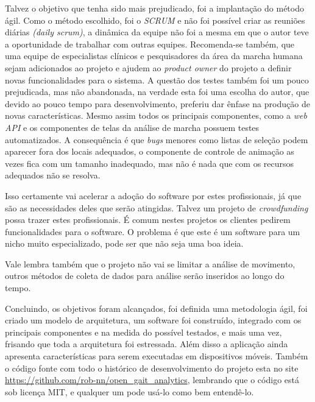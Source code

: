 Talvez o objetivo que tenha sido mais prejudicado, foi a implantação do método ágil. 
Como o método escolhido, foi o \emph{SCRUM} e não foi possível criar as reuniões diárias \emph{(daily scrum)}, a dinâmica da equipe não foi a mesma em que o autor teve a oportunidade de trabalhar com outras equipes.
Recomenda-se também, que uma equipe de especialistas clínicos e pesquisadores da área da marcha humana sejam adicionados ao projeto e ajudem ao \emph{product owner} do projeto a definir novas funcionalidades para o sistema. 
A questão dos testes também foi um pouco prejudicada, mas não abandonada, na verdade esta foi uma escolha do autor, que devido ao pouco tempo para desenvolvimento, preferiu dar ênfase na produção de novas características. Mesmo assim todos os principais componentes, como a \emph{web API} e os componentes de telas da análise de marcha possuem testes automatizados.
A consequência é que \emph{bugs} menores como listas de seleção podem aparecer fora dos locais adequados, o componente de controle de animação as vezes fica com um tamanho inadequado, mas não é nada que com os recursos adequados não se resolva.

Isso certamente vai acelerar a adoção do software por estes profissionais, já que são as necessidades deles que serão atingidas.
Talvez um projeto de \emph{crowdfunding} possa trazer estes profissionais. 
É comum nestes projetos os clientes pedirem funcionalidades para o software.
O problema é que este é um software para um nicho muito especializado, pode ser que não seja uma boa ideia.

Vale lembra também que o projeto não vai se limitar a análise de movimento, outros métodos de coleta de dados para análise serão inseridos ao longo do tempo.


Concluindo, os objetivos foram alcançados, foi definida uma metodologia ágil, foi criado um modelo de arquitetura, um software foi construído, integrado com os principais componentes e na medida do possível testados, e mais uma vez, frisando que toda a arquitetura foi estressada. 
Além disso a aplicação ainda apresenta características para serem executadas em dispositivos móveis. 
Também o código fonte com todo o histórico de desenvolvimento do projeto esta no site \url{https://github.com/rob-nn/open\_gait\_analytics}, lembrando que o código está sob licença MIT, e qualquer um pode usá-lo como bem entendê-lo.
